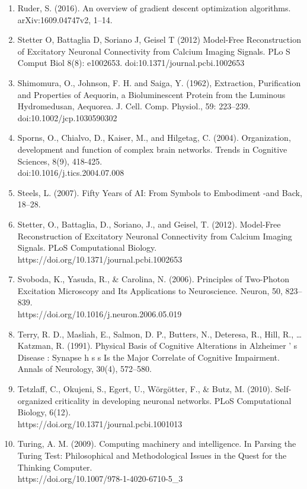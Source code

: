 \documentclass[11pt]{article}
\begin{document}
\begin{enumerate}
\item Ruder, S. (2016). An overview of gradient descent optimization algorithms.\\ arXiv:1609.04747v2, 1–14.
\item Stetter  O,  Battaglia  D,  Soriano  J,  Geisel  T  (2012)  Model-Free  Reconstruction  of  Excitatory  Neuronal  Connectivity  from  Calcium  Imaging  Signals.  PLo S Comput  Biol  8(8):  e1002653. doi:10.1371/journal.pcbi.1002653
\item Shimomura, O., Johnson, F. H. and Saiga, Y. (1962), Extraction, Purification and Properties of Aequorin, a Bioluminescent Protein from the Luminous Hydromedusan, Aequorea. J. Cell. Comp. Physiol., 59: 223–239. doi:10.1002/jcp.1030590302
\item Sporns, O., Chialvo, D., Kaiser, M., and Hilgetag, C. (2004). Organization, development and function of complex brain networks. Trends in Cognitive Sciences, 8(9), 418-425. \\doi:10.1016/j.tics.2004.07.008
\item Steels, L. (2007). Fifty Years of AI: From Symbols to Embodiment -and Back, 18–28.
\item Stetter, O., Battaglia, D., Soriano, J., and Geisel, T. (2012). Model-Free Reconstruction of Excitatory Neuronal Connectivity from Calcium Imaging Signals. PLoS Computational Biology. https://doi.org/10.1371/journal.pcbi.1002653
\item Svoboda, K., Yasuda, R., \& Carolina, N. (2006). Principles of Two-Photon Excitation Microscopy and Its Applications to Neuroscience. Neuron, 50, 823–839.\\https://doi.org/10.1016/j.neuron.2006.05.019
\item Terry, R. D., Masliah, E., Salmon, D. P., Butters, N., Deteresa, R., Hill, R., … Katzman, R. (1991). Physical Basis of Cognitive Alterations in Alzheimer ’ s Disease : Synapse h s s Is the Major Correlate of Cognitive Impairment. Annals of Neurology, 30(4), 572–580.
\item Tetzlaff, C., Okujeni, S., Egert, U., Wörgötter, F., \& Butz, M. (2010). Self-organized criticality in developing neuronal networks. PLoS Computational Biology, 6(12).\\https://doi.org/10.1371/journal.pcbi.1001013
\item Turing, A. M. (2009). Computing machinery and intelligence. In Parsing the Turing Test: Philosophical and Methodological Issues in the Quest for the Thinking Computer.\\https://doi.org/10.1007/978-1-4020-6710-5\_3

\end{enumerate}
\end{document}

